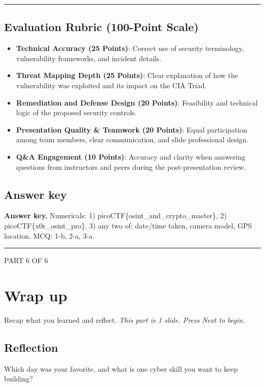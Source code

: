 \documentclass[12pt,openany]{book}
\begin{document}
\medskip\noindent\rule{\linewidth}{0.4pt}\medskip

\medskip

\subsection*{Evaluation Rubric (100-Point Scale)}


\begin{itemize}

  \item \textbf{Technical Accuracy (25 Points)}: Correct use of security terminology, vulnerability frameworks, and incident details.

  \item \textbf{Threat Mapping Depth (25 Points)}: Clear explanation of how the vulnerability was exploited and its impact on the CIA Triad.

  \item \textbf{Remediation and Defense Design (20 Points)}: Feasibility and technical logic of the proposed security controls.

  \item \textbf{Presentation Quality \& Teamwork (20 Points)}: Equal participation among team members, clear communication, and slide professional design.

  \item \textbf{Q\&A Engagement (10 Points)}: Accuracy and clarity when answering questions from instructors and peers during the post-presentation review.

\end{itemize}

\medskip

\subsection*{Answer key}


\textbf{Answer key.} Numericals: 1) picoCTF\{osint\_and\_crypto\_master\}, 2) picoCTF\{x0r\_osint\_pro\}, 3) any two of: date/time taken, camera model, GPS location. MCQ: 1-b, 2-a, 3-a.


\medskip\noindent\rule{\linewidth}{0.4pt}\medskip

\medskip

\vspace{4pt}\noindent\textsc{PART 6 OF 6}


\section*{Wrap up}

Recap what you learned and reflect.
{\small\itshape\color{gray}This part is 1 slide. Press Next to begin.}

\medskip

\subsection*{Reflection}


Which day was your favorite, and what is one cyber skill you want to keep building?

\medskip
\end{document}
